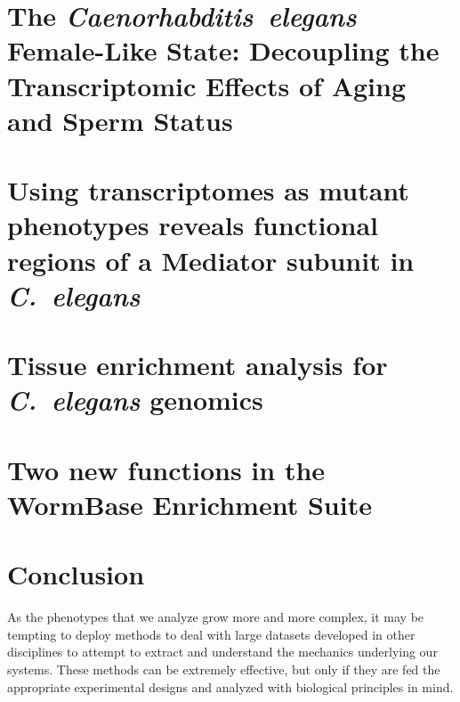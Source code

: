\documentclass[12pt]{caltech_thesis}
\newcommand{\cel}{\emph{C.~elegans}}
\begin{document}
\chapter{The \emph{Caenorhabditis~elegans} Female-Like State: Decoupling the
         Transcriptomic Effects of Aging and Sperm Status}
\begin{refsection}
  
  \printbibliography[heading=subbibliography]
\end{refsection}

\chapter{Using transcriptomes as mutant phenotypes reveals functional regions of
         a Mediator subunit in \cel{}}
\begin{refsection}
  
  \printbibliography[heading=subbibliography]
\end{refsection}

\chapter{Tissue enrichment analysis for \cel{} genomics}
\begin{refsection}
  
  \printbibliography[heading=subbibliography]
\end{refsection}

\chapter{Two new functions in the WormBase Enrichment Suite}
\begin{refsection}
  
  \printbibliography[heading=subbibliography]
\end{refsection}


\chapter*{Conclusion}

As the phenotypes that we analyze grow more and more complex, it may be tempting
to deploy methods to deal with large datasets developed in other disciplines to
attempt to extract and understand the mechanics underlying our systems. These
methods can be extremely effective, but only if they are fed the appropriate
experimental designs and analyzed with biological principles in mind.
\end{document}
